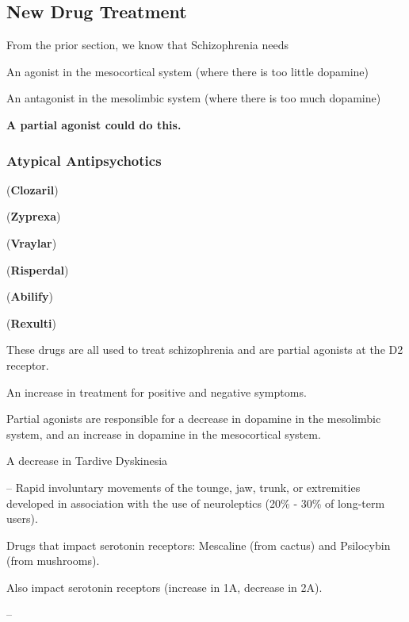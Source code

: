 \subsection{New Drug Treatment}

\begin{coloredlist}
    \item From the prior section, we know that Schizophrenia needs
    \begin{coloredlist}
        \item An agonist in the mesocortical system (where there is too little dopamine)
        \item An antagonist in the mesolimbic system (where there is too much dopamine)
        \item \textbf{A partial agonist could do this.}
    \end{coloredlist}
\end{coloredlist}

\subsubsection{Atypical Antipsychotics}

\begin{coloredlist}
\begin{multicols}{2}
    \item {} (\textbf{Clozaril})
    \item {} (\textbf{Zyprexa})
    \item {} (\textbf{Vraylar})
    \item {} (\textbf{Risperdal})
    \item {} (\textbf{Abilify})
    \item {} (\textbf{Rexulti})
\end{multicols}
    \item These drugs are all used to treat schizophrenia and are partial agonists at the D2 receptor.
    \item An increase in treatment for positive and negative symptoms.
    \item Partial agonists are responsible for a decrease in dopamine in the mesolimbic system, and an increase in dopamine in the mesocortical system.
    \item A decrease in Tardive Dyskinesia
    \item {} -- Rapid involuntary movements of the tounge, jaw, trunk, or extremities developed in association with the use of neuroleptics (20\% - 30\% of long-term users).
    \item Drugs that impact serotonin receptors: Mescaline (from cactus) and Psilocybin (from mushrooms). 
    \item Also impact serotonin receptors (increase in 1A, decrease in 2A).
    \begin{coloredlist}
        \item {} -- 
    \end{coloredlist}
\end{coloredlist}

